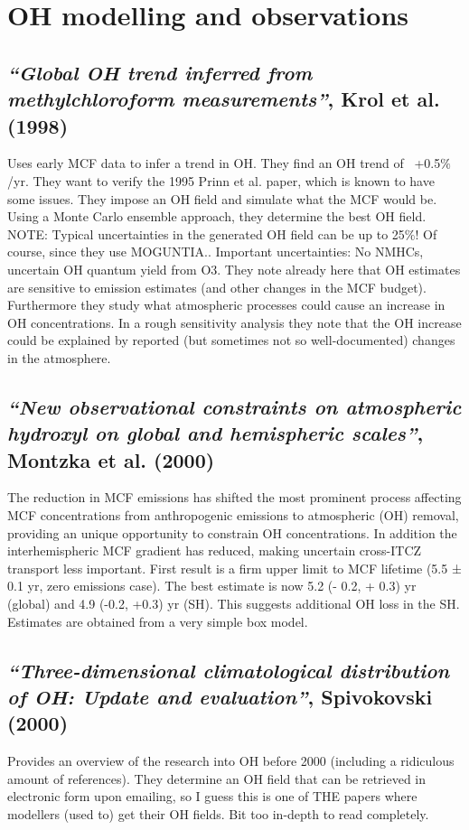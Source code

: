 \documentclass{article}
\begin{document}
\section{OH modelling and observations}

\subsection{\textit{“Global OH trend inferred from methylchloroform measurements”}, Krol et al. (1998)}
Uses early MCF data to infer a trend in OH. They find an OH trend of ~+0.5$\%$/yr. They want to verify the 1995 Prinn et al. paper, which is known to have some issues.
They impose an OH field and simulate what the MCF would be. Using a Monte Carlo ensemble approach, they determine the best OH field. NOTE: Typical uncertainties in the generated OH field can be up to 25$\%$! Of course, since they use MOGUNTIA..
Important uncertainties: No NMHCs, uncertain OH quantum yield from O3.
They note already here that OH estimates are sensitive to emission estimates (and other changes in the MCF budget). Furthermore they study what atmospheric processes could cause an increase in OH concentrations. In a rough sensitivity analysis they note that the OH increase could be explained by reported (but sometimes not so well-documented) changes in the atmosphere.

\subsection{\textit{“New observational constraints on atmospheric hydroxyl on global and hemispheric scales”}, Montzka et al. (2000)}
The reduction in MCF emissions has shifted the most prominent process affecting MCF concentrations from anthropogenic emissions to atmospheric (OH) removal, providing an unique opportunity to constrain OH concentrations. In addition the interhemispheric MCF gradient has reduced, making uncertain cross-ITCZ transport less important. First result is a firm upper limit to MCF lifetime (5.5 ± 0.1 yr, zero emissions case). The best estimate is now 5.2 (- 0.2, + 0.3) yr (global) and 4.9 (-0.2, +0.3) yr (SH). This suggests additional OH loss in the SH. Estimates are obtained from a very simple box model.

\subsection{\textit{“Three-dimensional climatological distribution of OH: Update and evaluation”}, Spivokovski (2000)}
Provides an overview of the research into OH before 2000 (including a ridiculous amount of references). They determine an OH field that can be retrieved in electronic form upon emailing, so I guess this is one of THE papers where modellers (used to) get their OH fields. Bit too in-depth to read completely.
\end{document}

